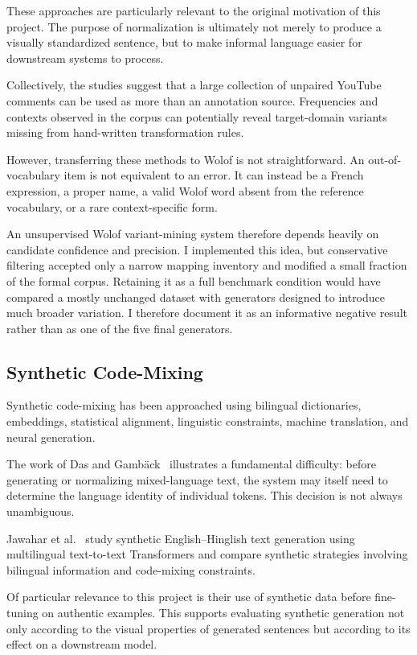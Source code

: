 \documentclass[12pt, a4paper, twoside, openany]{report}
\begin{document}
These approaches are particularly relevant to the original motivation of this project. The purpose of normalization is ultimately not merely to produce a visually standardized sentence, but to make informal language easier for downstream systems to process.

Collectively, the studies suggest that a large collection of unpaired YouTube comments can be used as more than an annotation source. Frequencies and contexts observed in the corpus can potentially reveal target-domain variants missing from hand-written transformation rules.

However, transferring these methods to Wolof is not straightforward. An out-of-vocabulary item is not equivalent to an error. It can instead be a French expression, a proper name, a valid Wolof word absent from the reference vocabulary, or a rare context-specific form.

An unsupervised Wolof variant-mining system therefore depends heavily on candidate confidence and precision. I implemented this idea, but conservative filtering accepted only a narrow mapping inventory and modified a small fraction of the formal corpus. Retaining it as a full benchmark condition would have compared a mostly unchanged dataset with generators designed to introduce much broader variation. I therefore document it as an informative negative result rather than as one of the five final generators.


\subsection{Synthetic Code-Mixing}

Synthetic code-mixing has been approached using bilingual dictionaries, embeddings, statistical alignment, linguistic constraints, machine translation, and neural generation.

The work of Das and Gamb{\"a}ck~\cite{das2013codemixing} illustrates a fundamental difficulty: before generating or normalizing mixed-language text, the system may itself need to determine the language identity of individual tokens. This decision is not always unambiguous.

Jawahar et al.~\cite{jawahar2021hinglish} study synthetic English--Hinglish text generation using multilingual text-to-text Transformers and compare synthetic strategies involving bilingual information and code-mixing constraints.

Of particular relevance to this project is their use of synthetic data before fine-tuning on authentic examples. This supports evaluating synthetic generation not only according to the visual properties of generated sentences but according to its effect on a downstream model.
\end{document}

